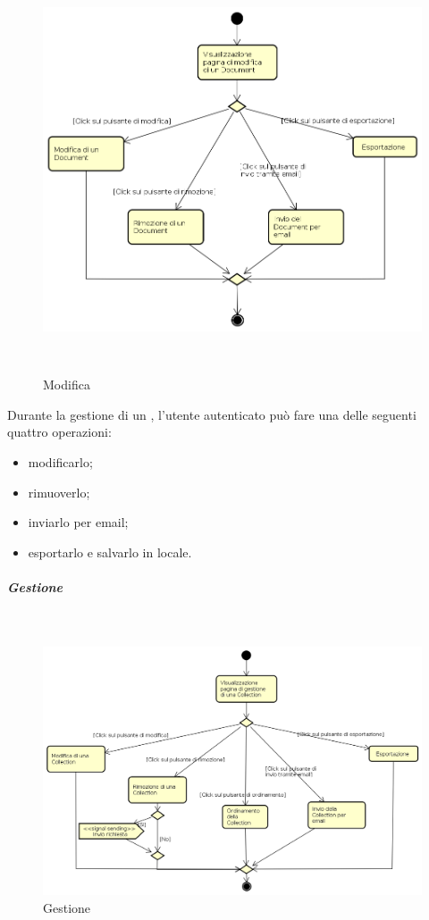 \begin{figure}[H]
\begin{center}
\includegraphics[height=12cm]{res/sections/backend/activities/modificaDocument.png}
\caption{Modifica }
\end{center}
\end{figure}
Durante la gestione di un , l'utente autenticato può fare una delle seguenti quattro operazioni:
\begin{itemize}
\item modificarlo;
\item rimuoverlo;
\item inviarlo per email;
\item esportarlo e salvarlo in locale.
\end{itemize}
\newpage
\subparagraph{Gestione } \mbox{} \\
\begin{figure}[H]
\begin{center}
\includegraphics[width=16cm]{res/sections/backend/activities/gestioneCollection.png}
\caption{Gestione }
\end{center}
\end{figure}
